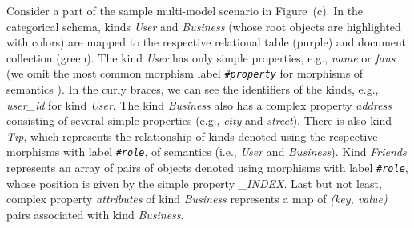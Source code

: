 \begin{example}
Consider a part of the sample multi-model scenario in Figure~(c). %
In the categorical schema, kinds \emph{User} and \emph{Business} (whose root objects are highlighted with colors) are mapped to the respective relational table (purple) and document collection (green). The kind \emph{User} has only simple properties, e.g., \emph{name} or \emph{fans} (we omit the most common morphism label \emph{\texttt{\#property}} for morphisms of semantics ). In the curly braces, we can see the identifiers of the kinds, e.g., \emph{user\_id} for kind \emph{User}. The kind \emph{Business} also has a complex property \emph{address} consisting of several simple properties (e.g., \emph{city} and \emph{street}). There is also kind \emph{Tip}, which represents the relationship of kinds denoted using the respective morphisms with label \emph{\texttt{\#role}}, of semantics  (i.e., \emph{User} and \emph{Business}). %
Kind \emph{Friends} represents an array of pairs of objects denoted using morphisms with label \emph{\texttt{\#role}}, whose position is given by the simple property \emph{\_INDEX}. Last but not least, complex property \emph{attributes} of kind \emph{Business} represents a map of \emph{(key, value)} pairs associated with kind \emph{Business}.
\end{example}


